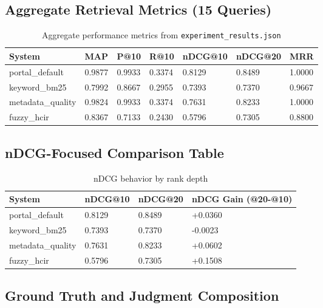 \documentclass[11pt,a4paper]{article}
\begin{document}
\subsection{Aggregate Retrieval Metrics (15 Queries)}

\begin{table}[H]
\centering
\begin{tabular}{p{} p{} p{} p{} p{} p{} p{}}
\toprule
\textbf{System} & \textbf{MAP} & \textbf{P@10} & \textbf{R@10} & \textbf{nDCG@10} & \textbf{nDCG@20} & \textbf{MRR} \\
\midrule
portal\_default & 0.9877 & 0.9933 & 0.3374 & 0.8129 & 0.8489 & 1.0000 \\
keyword\_bm25 & 0.7992 & 0.8667 & 0.2955 & 0.7393 & 0.7370 & 0.9667 \\
metadata\_quality & 0.9824 & 0.9933 & 0.3374 & 0.7631 & 0.8233 & 1.0000 \\
fuzzy\_hcir & 0.8367 & 0.7133 & 0.2430 & 0.5796 & 0.7305 & 0.8800 \\
\bottomrule
\end{tabular}
\caption{Aggregate performance metrics from \texttt{experiment_results.json}}
\end{table}

\subsection{nDCG-Focused Comparison Table}

\begin{table}[H]
\centering
\begin{tabular}{p{} p{} p{} p{}}
\toprule
\textbf{System} & \textbf{nDCG@10} & \textbf{nDCG@20} & \textbf{nDCG Gain (@20-@10)} \\
\midrule
portal\_default & 0.8129 & 0.8489 & +0.0360 \\
keyword\_bm25 & 0.7393 & 0.7370 & -0.0023 \\
metadata\_quality & 0.7631 & 0.8233 & +0.0602 \\
fuzzy\_hcir & 0.5796 & 0.7305 & +0.1508 \\
\bottomrule
\end{tabular}
\caption{nDCG behavior by rank depth}
\end{table}

\subsection{Ground Truth and Judgment Composition}
\end{document}
